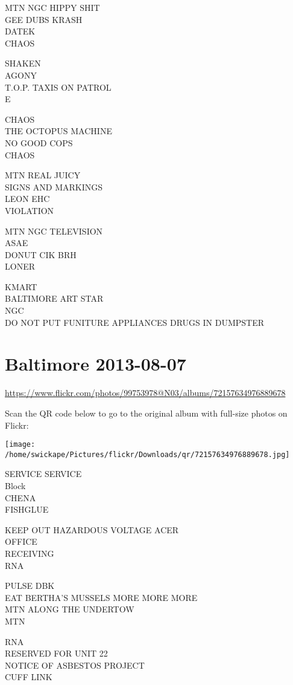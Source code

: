 \documentclass[10pt,letterpaper]{article}
\begin{document}
MTN NGC HIPPY SHIT\\
GEE DUBS KRASH\\
DATEK\\
CHAOS

SHAKEN\\
AGONY\\
T.O.P. TAXIS ON PATROL\\
E

CHAOS\\
THE OCTOPUS MACHINE\\
NO GOOD COPS\\
CHAOS

MTN REAL JUICY\\
SIGNS AND MARKINGS\\
LEON EHC\\
VIOLATION

MTN NGC TELEVISION\\
ASAE\\
DONUT CIK BRH\\
LONER

KMART\\
BALTIMORE ART STAR\\
NGC\\
DO NOT PUT FUNITURE APPLIANCES DRUGS IN DUMPSTER


\section*{Baltimore 2013-08-07}

\url{https://www.flickr.com/photos/99753978@N03/albums/72157634976889678}

Scan the QR code below to go to the original album with full-size photos on Flickr:

\texttt{[image: /home/swickape/Pictures/flickr/Downloads/qr/72157634976889678.jpg]}


SERVICE SERVICE\\
Block\\
CHENA\\
FISHGLUE

KEEP OUT HAZARDOUS VOLTAGE ACER\\
OFFICE\\
RECEIVING\\
RNA

PULSE DBK\\
EAT BERTHA'S MUSSELS MORE MORE MORE\\
MTN ALONG THE UNDERTOW\\
MTN

RNA\\
RESERVED FOR UNIT 22\\
NOTICE OF ASBESTOS PROJECT\\
CUFF LINK
\end{document}
